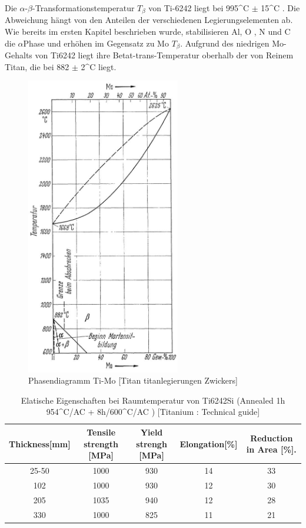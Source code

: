 Die $\alpha$-$\beta$-Transformationstemperatur $T_{\beta}$ von Ti-6242 liegt bei 995^\circ C $\pm$ 15^\circ C . Die Abweichung hängt  von den Anteilen der verschiedenen Legierungselementen ab. Wie bereits im ersten Kapitel beschrieben wurde, stabilisieren  Al, O , N und C die $\alpha$Phase und erhöhen im Gegensatz zu Mo  {$T_{\beta}$}.
Aufgrund des niedrigen Mo-Gehalts von Ti6242 liegt ihre Betat-trans-Temperatur oberhalb der von Reinem Titan, die bei 882 $\pm$ 2^\circ C liegt.


\begin{figure}[H]
	\centering
	\includegraphics[width= 0.6\textwidth]{Bilder/TiMo}
	\caption{Phasendiagramm Ti-Mo [Titan titanlegierungen Zwickers]}
	\label{TiMo}
\end{figure}

\begin{table}[H]
	\small
	\tabcolsep=0.09cm
	\centering	
	\begin{tabular}{|c |c |c|c |c|}
		\hline
		\centering
		Thickness[mm] & Tensile strength [MPa] & Yield strengh [MPa] & Elongation[\%]& Reduction in Area [\%]. \\
		\hline
		25-50&1000&930&14&33\\
		102&1000&930&12&30\\
		205&1035&940&12&28\\
		330&1000&825&11&21\\
		
		\hline
	\end{tabular}
	\caption{Elatische Eigenschaften bei Raumtemperatur von Ti6242Si (Annealed 1h 954^\circ C/AC + 8h/600^\circ C/AC )  [Titanium : Technical guide]}
	\label{Mecprop}
\end{table}






